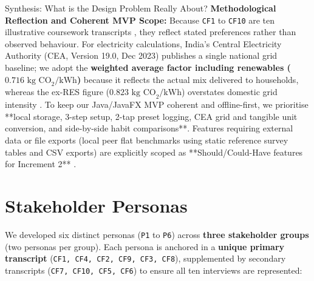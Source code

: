 \documentclass[12pt, a4paper]{article}
\begin{document}
\begin{synthesisbox}{Synthesis: What is the Design Problem Really About?}
\textbf{Methodological Reflection and Coherent MVP Scope:} Because \texttt{CF1} to \texttt{CF10} are ten illustrative coursework transcripts \cite{cf1, cf10}, they reflect stated preferences rather than observed behaviour. For electricity calculations, India's Central Electricity Authority (CEA, Version 19.0, Dec 2023) publishes a single national grid baseline; we adopt the \textbf{weighted average factor including renewables ($0.716\text{ kg CO}_2/\text{kWh}$)} because it reflects the actual mix delivered to households, whereas the ex-RES figure ($0.823\text{ kg CO}_2/\text{kWh}$) overstates domestic grid intensity \cite{cea2023}. To keep our Java/JavaFX MVP coherent and offline-first, we prioritise **local storage, 3-step setup, 2-tap preset logging, CEA grid and tangible unit conversion, and side-by-side habit comparisons**. Features requiring external data or file exports (local peer flat benchmarks using static reference survey tables and CSV exports) are explicitly scoped as **Should/Could-Have features for Increment 2** \cite{cf2, cf4}.
\end{synthesisbox}

\section{Stakeholder Personas}
We developed six distinct personas (\texttt{P1} to \texttt{P6}) across \textbf{three stakeholder groups} (two personas per group). Each persona is anchored in a \textbf{unique primary transcript} (\texttt{CF1, CF4, CF2, CF9, CF3, CF8}), supplemented by secondary transcripts (\texttt{CF7, CF10, CF5, CF6}) to ensure all ten interviews are represented:
\end{document}
